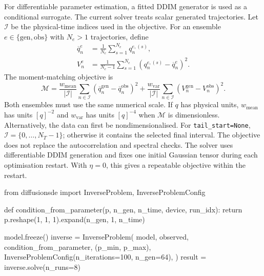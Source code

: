 For differentiable parameter estimation, a fitted DDIM generator is used as a
conditional surrogate. The current solver treats scalar generated trajectories.
Let $\mathcal{I}$ be the physical-time indices used in the objective. For an
ensemble $e\in\{\mathrm{gen},\mathrm{obs}\}$ with $N_e>1$ trajectories, define
\begin{align}
  \overline{q}_n^e
  &= \frac{1}{N_e}\sum_{s=1}^{N_e}q_n^{e,(s)},
  \label{eq:ensemble_mean}\\
  V_n^e
  &= \frac{1}{N_e-1}\sum_{s=1}^{N_e}
  \left(q_n^{e,(s)}-\overline{q}_n^e\right)^2 .
  \label{eq:ensemble_variance}
\end{align}
The moment-matching objective is
\begin{equation}
  \mathcal{M}=\frac{w_{\mathrm{mean}}}{|\mathcal{I}|}
  \sum_{n\in\mathcal{I}}(\overline{q}_n^{\mathrm{gen}}-\overline{q}_n^{\mathrm{obs}})^2
  +\frac{w_{\mathrm{var}}}{|\mathcal{I}|}
  \sum_{n\in\mathcal{I}}(V_n^{\mathrm{gen}}-V_n^{\mathrm{obs}})^2 .
  \label{eq:moment_matching_loss}
\end{equation}
Both ensembles must use the same numerical scale. If $q$ has physical units,
$w_{\mathrm{mean}}$ has units $[q]^{-2}$ and $w_{\mathrm{var}}$ has units
$[q]^{-4}$ when $\mathcal{M}$ is dimensionless. Alternatively, the data can first
be nondimensionalised. For
\texttt{tail\_start=None}, $\mathcal{I}=\{0,\ldots,N_T-1\}$; otherwise it contains
the selected final interval. The objective does not replace the autocorrelation and
spectral checks. The solver uses differentiable DDIM generation and fixes one
initial Gaussian tensor during each optimisation restart. With $\eta=0$, this gives
a repeatable objective within the restart.

\begin{pythonlisting}
from diffusionsde import InverseProblem, InverseProblemConfig

def condition_from_parameter(p, n_gen, n_time, device, run_idx):
    return p.reshape(1, 1, 1).expand(n_gen, 1, n_time)

model.freeze()
inverse = InverseProblem(
    model, observed, condition_from_parameter, (p_min, p_max),
    InverseProblemConfig(n_iterations=100, n_gen=64),
)
result = inverse.solve(n_runs=8)
\end{pythonlisting}



